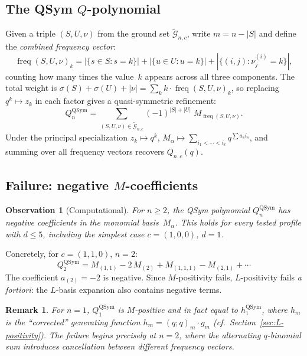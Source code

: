 \documentclass[11pt]{article}
\newtheorem{remark}[theorem]{Remark}
\newtheorem{observation}[theorem]{Observation}
\newcommand{\qpochn}[3]{(#1;#2)_{#3}}
\newcommand{\QSym}{\operatorname{QSym}}
\begin{document}
\subsection{The QSym $Q$-polynomial}

Given a triple $(S, U, \nu)$ from the ground set
$\widetilde{\mathcal{G}}_{n,c}$, write $m = n - |S|$ and define the
\emph{combined frequency vector}:
\[
  \operatorname{freq}(S, U, \nu)_k
  = |\{s \in S : s = k\}|
  + |\{u \in U : u = k\}|
  + |\{(i,j) : \nu^{(i)}_j = k\}|,
\]
counting how many times the value~$k$ appears across all three
components. The total weight is
$\sigma(S) + \sigma(U) + |\nu| = \sum_k k \cdot \operatorname{freq}(S,U,\nu)_k$,
so replacing $q^k \mapsto z_k$ in each factor gives a
quasi-symmetric refinement:
\begin{equation}\label{eq:Q-qsym}
  Q_n^{\QSym}
  = \sum_{(S,U,\nu) \in \widetilde{\mathcal{G}}_{n,c}}
    (-1)^{|S|+|U|}\; M_{\operatorname{freq}(S,U,\nu)}.
\end{equation}
Under the principal specialization $z_k \mapsto q^k$,
$M_\alpha \mapsto \sum_{i_1 < \cdots < i_\ell} q^{\sum a_s i_s}$,
and summing over all frequency vectors recovers $Q_{n,c}(q)$.

\subsection{Failure: negative $M$-coefficients}

\begin{observation}[Computational]\label{obs:Q-not-M-pos}
For $n \geq 2$, the QSym polynomial $Q_n^{\QSym}$ has
\emph{negative} coefficients in the monomial basis~$M_\alpha$.
This holds for every tested profile with $d \leq 5$, including
the simplest case $c = (1,0,0)$, $d = 1$.
\end{observation}

Concretely, for $c = (1,1,0)$, $n = 2$:
\[
  Q_2^{\QSym}
  = M_{(1,1)} - 2\,M_{(2)} + M_{(1,1,1)} - M_{(2,1)} + \cdots
\]
The coefficient $a_{(2)} = -2$ is negative. Since $M$-positivity
fails, $L$-positivity fails \emph{a fortiori}: the $L$-basis
expansion also contains negative terms.

\begin{remark}
For $n = 1$, $Q_1^{\QSym}$ is $M$-positive and in fact equal to
$h_1^{\QSym}$, where $h_m$ is the ``corrected'' generating function
$h_m = \qpochn{q}{q}{m} \cdot g_m$ (cf.\ Section~\ref{sec:L-positivity}).
The failure begins precisely at $n = 2$, where the alternating
$q$-binomial sum introduces cancellation between different
frequency vectors.
\end{remark}
\end{document}
